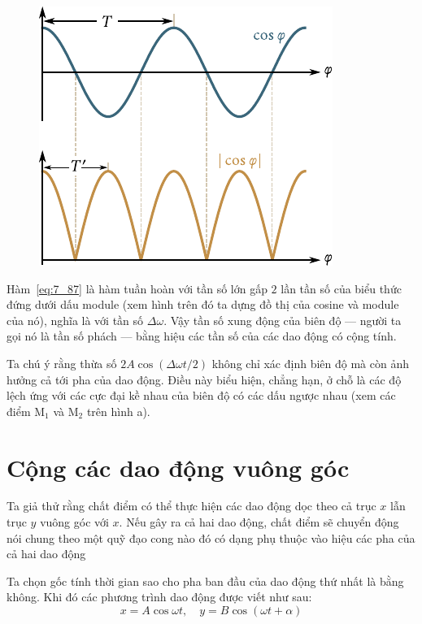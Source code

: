 \begin{figure}[!htb]
	\begin{minipage}[t]{\linewidth}
		\begin{center}
			\includegraphics[scale=0.85]{figures/ch_07/fig_7_12.pdf}
			\caption[]{}
			\label{fig:7_12}
		\end{center}
	\end{minipage}
\end{figure}

Hàm~\eqref{eq:7_87} là hàm tuần hoàn với tần số lớn gấp $2$ lần tần số của biểu thức đứng dưới dấu module (xem hình  trên đó ta dựng đồ thị của cosine và module của nó), nghĩa là với tần số $\Delta\omega$. Vậy tần số xung động của biên độ --- người ta gọi nó là tần số phách --- bằng hiệu các tần số của các dao động có cộng tính.

Ta chú ý rằng thừa số $2A\cos(\Delta\omega t/2)$ không chỉ xác định biên độ mà còn ảnh hưởng cả tới pha của dao động. Điều này biểu hiện, chẳng hạn, ở chỗ là các độ lệch ứng với các cực đại kề nhau của biên độ có các dấu ngược nhau (xem các điểm M$_1$ và M$_2$ trên hình a).

\section{Cộng các dao động vuông góc}\label{sec:7_9}

Ta giả thử rằng chất điểm có thể thực hiện các dao động dọc theo cả trục $x$ lẫn trục $y$ vuông góc với $x$. Nếu gây ra cả hai dao động, chất điểm sẽ chuyển động nói chung theo một quỹ đạo cong nào đó có dạng phụ thuộc vào hiệu các pha của cả hai dao động

Ta chọn gốc tính thời gian sao cho pha ban đầu của dao động thứ nhất là bằng không. Khi đó các phương trình dao động được viết như sau:
\begin{equation}\label{eq:7_88}
	x = A\cos\omega t,\quad y = B\cos(\omega t + \alpha)
\end{equation}

